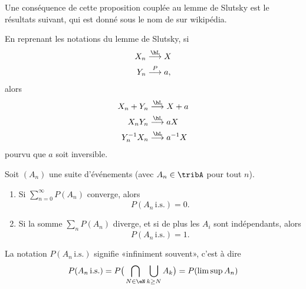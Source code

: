 Une conséquence de cette proposition couplée au lemme de Slutsky est le résultats suivant, qui est donné sous le nom de  sur wikipédia.
\begin{corollary}       \label{CorINgTPH}
    En reprenant les notations du lemme de Slutsky, si
    \begin{subequations}
        \begin{align}
            X_n&\stackrel{\hL}{\longrightarrow} X\\
            Y_n&\stackrel{P}{\longrightarrow} a,
        \end{align}
    \end{subequations}
    alors
    \begin{subequations}
        \begin{align}
            X_n+Y_n&\stackrel{\hL}{\longrightarrow}X+a\\
            X_nY_n&\stackrel{\hL}{\longrightarrow}aX\\
            Y_n^{-1}X_n&\stackrel{\hL}{\longrightarrow}a^{-1}X\\
        \end{align}
    \end{subequations}
    pourvu que \( a\) soit inversible.
\end{corollary}


\begin{lemma}
    Soit \( (A_n)\) une suite d'événements (avec \( A_n\in\tribA\) pour tout \( n\)).
    \begin{enumerate}
        \item
            Si \( \sum_{n=0}^{\infty}P(A_n)\) converge, alors
            \begin{equation}
                P(A_n\,\text{i.s.})=0.
            \end{equation}
        \item
            Si la somme \( \sum_nP(A_n)\) diverge, et si de plus les \( A_i\) sont indépendants, alors
            \begin{equation}
                P(A_n\,\text{i.s.})=1.
            \end{equation}
    \end{enumerate}
\end{lemma}
La notation \( P(A_n\,\text{i.s.})\) signifie «infiniment souvent», c'est à dire
\begin{equation}
    P(A_n\,\text{i.s.})=P\big( \bigcap_{N\in\eN}\bigcup_{k\geq N}A_k \big)=P(\limsup A_n)
\end{equation}


